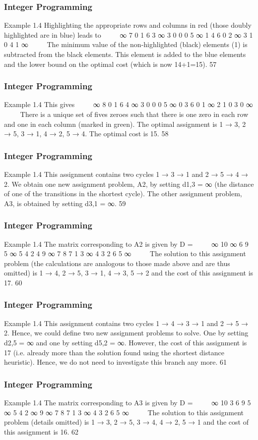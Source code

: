 \begin{frame} 
\frametitle{Integer Programming}     
Example 1.4
Highlighting the appropriate rows and columns in red (those
doubly highlighted are in blue) leads to


∞ 7 0 1 6
3 ∞ 3 0 0
0 5 ∞ 1 4
6 0 2 ∞ 3
1 0 4 1 ∞


The minimum value of the non-highlighted (black) elements (1) is
subtracted from the black elements.
This element is added to the blue elements and the lower bound on
the optimal cost (which is now 14+1=15).
57 \end{frame}  \begin{frame} \frametitle{Integer Programming}     
Example 1.4
This gives


∞ 8 0 1 6
4 ∞ 3 0 0
0 5 ∞ 0 3
6 0 1 ∞ 2
1 0 3 0 ∞


There is a unique set of fives zeroes such that there is one zero in
each row and one in each column (marked in green).
The optimal assignment is 1 → 3, 2 → 5, 3 → 1, 4 → 2, 5 → 4.
The optimal cost is 15.
58 \end{frame}  \begin{frame} \frametitle{Integer Programming}     
Example 1.4
This assignment contains two cycles 1 → 3 → 1 and
2 → 5 → 4 → 2.
We obtain one new assignment problem, A2, by setting d1,3 = ∞
(the distance of one of the transitions in the shortest cycle).
The other assignment problem, A3, is obtained by setting
d3,1 = ∞.
59
\end{frame}  
\begin{frame} 
\frametitle{Integer Programming}     
Example 1.4
The matrix corresponding to A2 is given by
D =


∞ 10 ∞ 6 9
5 ∞ 5 4 2
4 9 ∞ 7 8
7 1 3 ∞ 4
3 2 6 5 ∞


The solution to this assignment problem (the calculations are
analogous to those made above and are thus omitted) is 1 → 4,
2 → 5, 3 → 1, 4 → 3, 5 → 2 and the cost of this assignment is 17.
60 \end{frame}  
\begin{frame} \frametitle{Integer Programming}     
Example 1.4
This assignment contains two cycles 1 → 4 → 3 → 1 and
2 → 5 → 2.
Hence, we could define two new assignment problems to solve.
One by setting d2,5 = ∞ and one by setting d5,2 = ∞.
However, the cost of this assignment is 17 (i.e. already more than
the solution found using the shortest distance heuristic). Hence,
we do not need to investigate this branch any more.
61 \end{frame}  \begin{frame} \frametitle{Integer Programming}     
Example 1.4
The matrix corresponding to A3 is given by
D =


∞ 10 3 6 9
5 ∞ 5 4 2
∞ 9 ∞ 7 8
7 1 3 ∞ 4
3 2 6 5 ∞


The solution to this assignment problem (details omitted) is 1 → 3,
2 → 5, 3 → 4, 4 → 2, 5 → 1 and the cost of this assignment is 16.
62 
\end{frame}  
